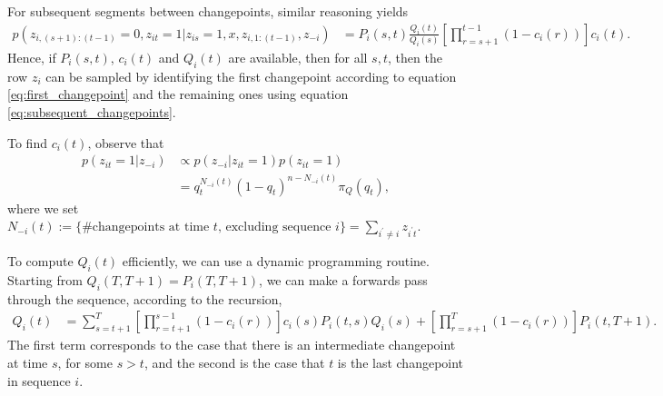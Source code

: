 For subsequent segments between changepoints, similar reasoning yields
\begin{align}
  p\left(z_{i, \left(s + 1\right):\left(t - 1\right)} = 0, z_{it} = 1 \vert z_{is} = 1, x, z_{i, 1:\left(t - 1\right)}, z_{-i}\right) &= P_{i}\left(s, t\right)\frac{Q_{i}\left(t\right)}{Q_{i}\left(s\right)} \left[\prod_{r = s + 1}^{t - 1} \left(1 - c_{i}\left(r\right)\right)\right]c_{i}\left(t\right). \label{eq:subsequent_changepoints}
\end{align}
Hence, if $P_{i}\left(s, t\right)$, $c_{i}\left(t\right)$ and
$Q_{i}\left(t\right)$ are available, then for all $s, t$, then the row $z_{i}$
can be sampled by identifying the first changepoint according to equation
\ref{eq:first_changepoint} and the remaining ones using equation
\ref{eq:subsequent_changepoints}.

To find $c_{i}\left(t\right)$, observe that
\begin{align*}
  p\left(z_{it} = 1 \vert z_{-i}\right) &\propto p\left(z_{-i} \vert z_{it} = 1\right) p\left(z_{it} = 1\right) \\
  &= q_{t}^{N_{-i}\left(t\right)} \left(1 - q_{t}\right)^{n - N_{-i}\left(t\right)} \pi_{Q}\left(q_{t}\right),
\end{align*}
where we set $N_{-i}\left(t\right) := \{\# \text{changepoints at time $t$,
excluding sequence } i\} = \sum_{i^\prime \neq i} z_{i^\prime t}$.

To compute $Q_{i}\left(t\right)$ efficiently, we can use a dynamic programming
routine. Starting from $Q_{i}\left(T, T + 1\right) = P_{i}\left(T, T +
1\right)$, we can make a forwards pass through the sequence, according to the
recursion,
\begin{align*}
  Q_{i}\left(t\right) &= \sum_{s = t + 1}^{T} \left[\prod_{r = t + 1}^{s - 1} \left(1 - c_{i}\left(r\right)\right)\right]c_{i}\left(s\right)P_{i}\left(t, s\right)Q_{i}\left(s\right) +
  \left[\prod_{r = s + 1}^{T}\left(1 - c_{i}\left(r\right)\right)\right]P_{i}\left(t, T + 1\right).
\end{align*}
The first term corresponds to the case that there is an intermediate changepoint
at time $s$, for some $s > t$, and the second is the case that $t$ is the last
changepoint in sequence $i$.

